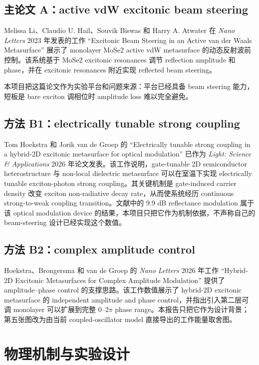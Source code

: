 \documentclass[UTF8,a4paper,12pt]{ctexart}
\begin{document}
\subsection{主论文 A：active vdW excitonic beam steering}

Melissa Li、Claudio U. Hail、Souvik Biswas 和 Harry A. Atwater 在 \emph{Nano Letters} 2023 年发表的工作 ``Excitonic Beam Steering in an Active van der Waals Metasurface'' 展示了 monolayer MoSe2 active vdW metasurface 的动态反射波前控制。该系统基于 MoSe2 excitonic resonances 调节 reflection amplitude 和 phase，并在 excitonic resonances 附近实现 reflected beam steering。

本项目把这篇论文作为实验平台和问题来源：平台已经具备 beam steering 能力，短板是 bare exciton 调相位时 amplitude loss 难以完全避免。

\subsection{方法 B1：electrically tunable strong coupling}

Tom Hoekstra 和 Jorik van de Groep 的 ``Electrically tunable strong coupling in a hybrid-2D excitonic metasurface for optical modulation'' 已作为 \emph{Light: Science \& Applications} 2026 年论文发表。该工作说明，gate-tunable 2D semiconductor heterostructure 与 non-local dielectric metasurface 可以在室温下实现 electrically tunable exciton-photon strong coupling。其关键机制是 gate-induced carrier density 改变 exciton non-radiative decay rate，从而使系统经历 continuous strong-to-weak coupling transition。文献中的 9.9 dB reflectance modulation 属于该 optical modulation device 的结果，本项目只把它作为机制依据，不声称自己的 beam-steering 设计已经实现这个数值。

\subsection{方法 B2：complex amplitude control}

Hoekstra、Brongersma 和 van de Groep 的 \emph{Nano Letters} 2026 年工作 ``Hybrid-2D Excitonic Metasurfaces for Complex Amplitude Modulation'' 提供了 amplitude--phase control 的支撑思路。该工作数值展示了 hybrid-2D excitonic metasurface 的 independent amplitude and phase control，并指出引入第二层可调 monolayer 可以扩展到完整 $0$--$2\pi$ phase range。本报告只把它作为设计背景；第五张图改为由当前 coupled-oscillator model 直接导出的工作能量取舍图。

\section{物理机制与实验设计}
\end{document}

